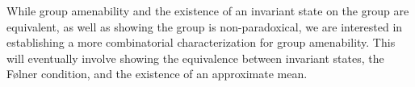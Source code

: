 %
%
%
%
While group amenability and the existence of an invariant state on the group are equivalent, as well as showing the group is non-paradoxical, we are interested in establishing a more combinatorial characterization for group amenability. This will eventually involve showing the equivalence between invariant states, the Følner condition, and the existence of an approximate mean.

